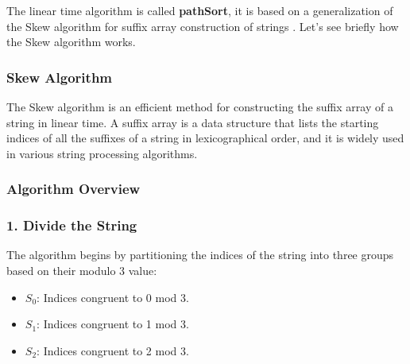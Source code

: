 The linear time algorithm is called \textbf{pathSort}, it is based on a generalization of the Skew algorithm for suffix array construction of strings \cite{karkkainen2006linear}. Let's see briefly how the Skew algorithm works.

\subsubsection{Skew Algorithm}
The Skew algorithm is an efficient method for constructing the suffix array of a string in linear time. A suffix array is a data structure that lists the starting indices of all the suffixes of a string in lexicographical order, and it is widely used in various string processing algorithms.

\subsubsection*{Algorithm Overview}

\subsubsection*{1. Divide the String}

The algorithm begins by partitioning the indices of the string into three groups based on their modulo 3 value:
\begin{itemize}
    \item $S_0$: Indices congruent to 0 mod 3.
    \item $S_1$: Indices congruent to 1 mod 3.
    \item $S_2$: Indices congruent to 2 mod 3.
\end{itemize}

